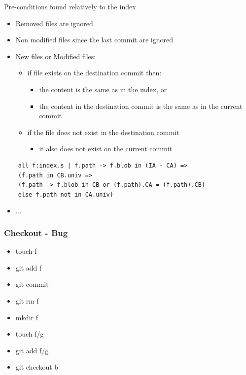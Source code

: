 \documentclass{beamer}
\begin{document}
\begin{frame}
   \begin{block}{Pre-conditions found relatively to the index}
      \begin{itemize}
         \item Removed files are ignored
         \item Non modified files since the last commit are ignored
         \item New files or Modified files:
            \begin{itemize}
               \item if file exists on the destination commit then:
                  \begin{itemize}
                     \item the content is the same as in the index, or
                     \item the content in 
		     the destination commit is the same as in the current commit
                  \end{itemize}
               \item if the file does not exist in the destination commit
                  \begin{itemize}
                     \item it also does not exist on the current commit
                  \end{itemize}
            \end{itemize}
      \end{itemize}
   \end{block}
\end{frame}

\begin{frame}[fragile]
	\scriptsize
	\begin{lstlisting}	
	all f:index.s | f.path -> f.blob in (IA - CA) => 
	(f.path in CB.univ => 
	(f.path -> f.blob in CB or (f.path).CA = (f.path).CB)
	else f.path not in CA.univ)
	\end{lstlisting}
	\normalsize
	\begin{itemize}
	\item ... 
	\end{itemize}
\end{frame}

\begin{frame}
	\frametitle{Checkout - Bug}
	\begin{itemize}
	   \item touch f \pause
	   \item git add f \pause
	   \item git commit \pause
	   \item git rm f \pause
	   \item mkdir f \pause
	   \item touch f/g \pause
	   \item git add f/g \pause 
	   \item git checkout b 
	\end{itemize}
\end{frame}
\end{document}
